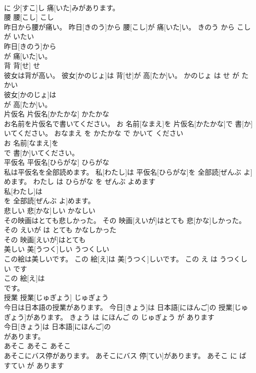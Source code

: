 \documentclass[8pt]{extreport}
\begin{document}
\begin{CJK}{UTF8}{min}
\\	に 少[すこ]し 痛[いた]みがあります。			
\\	腰	腰[こし]	こし	
\\	昨日から腰が痛い。	昨日[きのう]から 腰[こし]が 痛[いた]い。	きのう から こし が いたい	
\\	昨日[きのう]から
\\	が 痛[いた]い。			
\\	背	背[せ]	せ	
\\	彼女は背が高い。	彼女[かのじょ]は 背[せ]が 高[たか]い。	かのじょ は せ が たかい	
\\	彼女[かのじょ]は
\\	が 高[たか]い。			
\\	片仮名	片仮名[かたかな]	かたかな	
\\	お名前を片仮名で書いてください。	お 名前[なまえ]を 片仮名[かたかな]で 書[か]いてください。	おなまえ を かたかな で かいて ください	
\\	お 名前[なまえ]を
\\	で 書[か]いてください。			
\\	平仮名	平仮名[ひらがな]	ひらがな	
\\	私は平仮名を全部読めます。	私[わたし]は 平仮名[ひらがな]を 全部読[ぜんぶ よ]めます。	わたし は ひらがな を ぜんぶ よめます	
\\	私[わたし]は
\\	を 全部読[ぜんぶ よ]めます。			
\\	悲しい	悲[かな]しい	かなしい	
\\	その映画はとても悲しかった。	その 映画[えいが]はとても 悲[かな]しかった。	その えいが は とても かなしかった	
\\	その 映画[えいが]はとても
\\	美しい	美[うつく]しい	うつくしい	
\\	この絵は美しいです。	この 絵[え]は 美[うつく]しいです。	この え は うつくしい です	
\\	この 絵[え]は
\\	です。			
\\	授業	授業[じゅぎょう]	じゅぎょう	
\\	今日は日本語の授業があります。	今日[きょう]は 日本語[にほんご]の 授業[じゅぎょう]があります。	きょう は にほんご の じゅぎょう が あります	
\\	今日[きょう]は 日本語[にほんご]の
\\	があります。			
\\	あそこ	あそこ	あそこ	
\\	あそこにバス停があります。	あそこにバス 停[てい]があります。	あそこ に ばすてい が あります	

\end{CJK}
\end{document}
